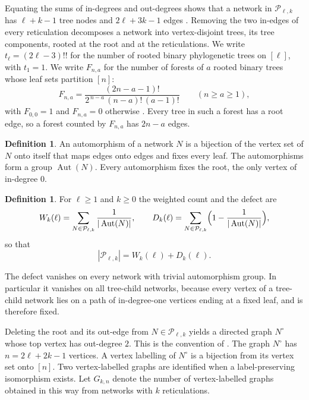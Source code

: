 \documentclass[11pt,a4paper]{article}
\theoremstyle{definition}
\newtheorem{definition}[theorem]{Definition}
\newcommand{\Aut}{\operatorname{Aut}}
\newcommand{\cP}{\mathcal{P}}
\begin{document}
Equating the sums of in-degrees and out-degrees shows that a network in $\cP_{\ell,k}$ has $\ell+k-1$ tree nodes and $2\ell+3k-1$ edges \cite[Prop.~2.1]{YuZhang26}. Removing the two in-edges of every reticulation decomposes a network into vertex-disjoint trees, its tree components, rooted at the root and at the reticulations. We write $t_\ell=(2\ell-3)!!$ for the number of rooted binary phylogenetic trees on $[\ell]$, with $t_1=1$. We write $F_{n,a}$ for the number of forests of $a$ rooted binary trees whose leaf sets partition $[n]$:
\begin{equation}\label{eq:forests}
F_{n,a}=\frac{(2n-a-1)!}{2^{\,n-a}\,(n-a)!\,(a-1)!}\qquad (n\ge a\ge 1),
\end{equation}
with $F_{0,0}=1$ and $F_{n,a}=0$ otherwise \cite[Prop.~2.8.1]{SempleSteel03}. Every tree in such a forest has a root edge, so a forest counted by $F_{n,a}$ has $2n-a$ edges.

\begin{definition}\label{def:aut}
An automorphism of a network $N$ is a bijection of the vertex set of $N$ onto itself that maps edges onto edges and fixes every leaf. The automorphisms form a group $\Aut(N)$. Every automorphism fixes the root, the only vertex of in-degree $0$.
\end{definition}

\begin{definition}\label{def:WD}
For $\ell\ge 1$ and $k\ge 0$ the weighted count and the defect are
\begin{equation}\label{eq:WD}
W_k(\ell)=\sum_{N\in\cP_{\ell,k}}\frac{1}{|\Aut(N)|},\qquad
D_k(\ell)=\sum_{N\in\cP_{\ell,k}}\Bigl(1-\frac{1}{|\Aut(N)|}\Bigr),
\end{equation}
so that
\begin{equation}\label{eq:split}
|\cP_{\ell,k}|=W_k(\ell)+D_k(\ell).
\end{equation}
\end{definition}

The defect vanishes on every network with trivial automorphism group. In particular it vanishes on all tree-child networks, because every vertex of a tree-child network lies on a path of in-degree-one vertices ending at a fixed leaf, and is therefore fixed.

Deleting the root and its out-edge from $N\in\cP_{\ell,k}$ yields a directed graph $N^\circ$ whose top vertex has out-degree $2$. This is the convention of \cite{Mansouri22}. The graph $N^\circ$ has $n=2\ell+2k-1$ vertices. A vertex labelling of $N^\circ$ is a bijection from its vertex set onto $[n]$. Two vertex-labelled graphs are identified when a label-preserving isomorphism exists. Let $G_{k,n}$ denote the number of vertex-labelled graphs obtained in this way from networks with $k$ reticulations.
\end{document}
